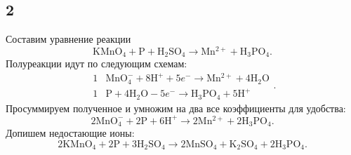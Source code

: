 \subsection{2}

Составим уравнение реакции
\[
\mathrm{KMnO_4}+\mathrm{P}+\mathrm{H_2SO_4}\longrightarrow\mathrm{Mn^{2+}}+\mathrm{H_3PO_4}.
\]
Полуреакции идут по следующим схемам:
\[
\begin{array}{r|l}
	1 & \mathrm{MnO_4^{-}}+8\mathrm{H^+}+5e^-\longrightarrow\mathrm{Mn^{2+}}+4\mathrm{H_2O} \\
	1 & \mathrm{P}+4\mathrm{H_2O}-5e^-\longrightarrow\mathrm{H_3PO_4}+5\mathrm{H^+}
\end{array}.
\]
Просуммируем полученное и умножим на два все коэффициенты для удобства:
\[
2\mathrm{MnO_4^{-}}+2\mathrm{P}+6\mathrm{H^+}\longrightarrow2\mathrm{Mn^{2+}}+2\mathrm{H_3PO_4}.
\]
Допишем недостающие ионы:
\[
2\mathrm{KMnO_4}+2\mathrm{P}+3\mathrm{H_2SO_4}\longrightarrow2\mathrm{MnSO_4}+\mathrm{K_2SO_4}+2\mathrm{H_3PO_4}.
\]